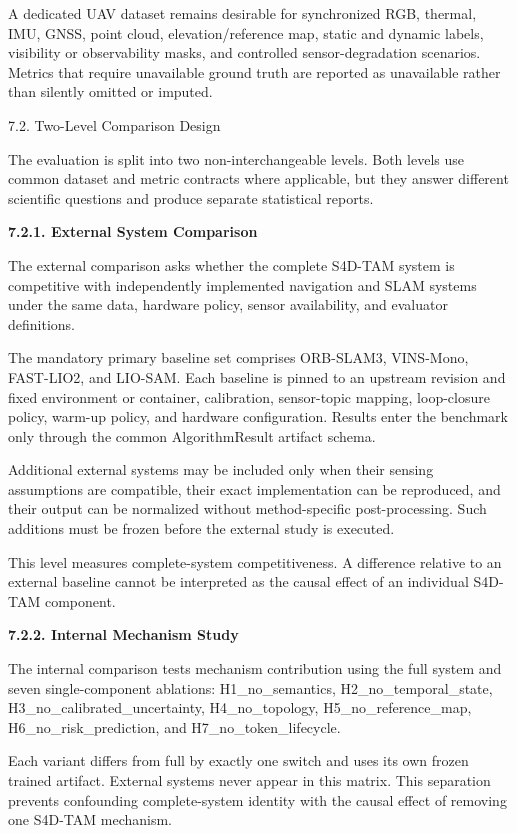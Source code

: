\documentclass[
]{article}
\begin{document}
A dedicated UAV dataset remains desirable for synchronized RGB, thermal,
IMU, GNSS, point cloud, elevation/reference map, static and dynamic
labels, visibility or observability masks, and controlled
sensor-degradation scenarios. Metrics that require unavailable ground
truth are reported as unavailable rather than silently omitted or
imputed.

7.2. Two-Level Comparison Design

The evaluation is split into two non-interchangeable levels. Both levels
use common dataset and metric contracts where applicable, but they
answer different scientific questions and produce separate statistical
reports.

\textbf{7.2.1. External System Comparison}

The external comparison asks whether the complete S4D-TAM system is
competitive with independently implemented navigation and SLAM systems
under the same data, hardware policy, sensor availability, and evaluator
definitions.

The mandatory primary baseline set comprises ORB-SLAM3, VINS-Mono,
FAST-LIO2, and LIO-SAM. Each baseline is pinned to an upstream revision
and fixed environment or container, calibration, sensor-topic mapping,
loop-closure policy, warm-up policy, and hardware configuration. Results
enter the benchmark only through the common AlgorithmResult artifact
schema.

Additional external systems may be included only when their sensing
assumptions are compatible, their exact implementation can be
reproduced, and their output can be normalized without method-specific
post-processing. Such additions must be frozen before the external study
is executed.

This level measures complete-system competitiveness. A difference
relative to an external baseline cannot be interpreted as the causal
effect of an individual S4D-TAM component.

\textbf{7.2.2. Internal Mechanism Study}

The internal comparison tests mechanism contribution using the full
system and seven single-component ablations: H1\_no\_semantics,
H2\_no\_temporal\_state, H3\_no\_calibrated\_uncertainty,
H4\_no\_topology, H5\_no\_reference\_map, H6\_no\_risk\_prediction, and
H7\_no\_token\_lifecycle.

Each variant differs from full by exactly one switch and uses its own
frozen trained artifact. External systems never appear in this matrix.
This separation prevents confounding complete-system identity with the
causal effect of removing one S4D-TAM mechanism.
\end{document}
